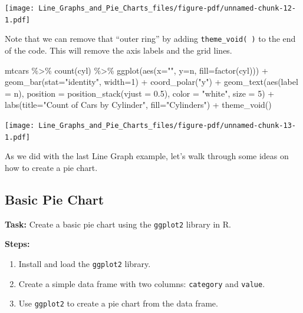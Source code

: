 \documentclass[
  letterpaper,
  DIV=11,
  numbers=noendperiod]{scrreprt}
\newenvironment{Shaded}{\begin{snugshade}}{\end{snugshade}}
\newcommand{\AttributeTok}[1]{\textcolor[rgb]{0.40,0.45,0.13}{#1}}
\newcommand{\DecValTok}[1]{\textcolor[rgb]{0.68,0.00,0.00}{#1}}
\newcommand{\FloatTok}[1]{\textcolor[rgb]{0.68,0.00,0.00}{#1}}
\newcommand{\FunctionTok}[1]{\textcolor[rgb]{0.28,0.35,0.67}{#1}}
\newcommand{\NormalTok}[1]{\textcolor[rgb]{0.00,0.23,0.31}{#1}}
\newcommand{\SpecialCharTok}[1]{\textcolor[rgb]{0.37,0.37,0.37}{#1}}
\newcommand{\StringTok}[1]{\textcolor[rgb]{0.13,0.47,0.30}{#1}}
\providecommand{\tightlist}{%
  \setlength{\itemsep}{0pt}\setlength{\parskip}{0pt}}\usepackage{longtable,booktabs,array}
\begin{document}
\texttt{[image: Line\_Graphs\_and\_Pie\_Charts\_files/figure-pdf/unnamed-chunk-12-1.pdf]}

Note that we can remove that ``outer ring'' by adding
\texttt{theme\_void(\ )} to the end of the code. This will remove the
axis labels and the grid lines.

\begin{Shaded}
\begin{Highlighting}[]
\NormalTok{mtcars }\SpecialCharTok{\%\textgreater{}\%}
  \FunctionTok{count}\NormalTok{(cyl) }\SpecialCharTok{\%\textgreater{}\%}
  \FunctionTok{ggplot}\NormalTok{(}\FunctionTok{aes}\NormalTok{(}\AttributeTok{x=}\StringTok{""}\NormalTok{, }\AttributeTok{y=}\NormalTok{n, }\AttributeTok{fill=}\FunctionTok{factor}\NormalTok{(cyl))) }\SpecialCharTok{+}
  \FunctionTok{geom\_bar}\NormalTok{(}\AttributeTok{stat=}\StringTok{"identity"}\NormalTok{, }\AttributeTok{width=}\DecValTok{1}\NormalTok{) }\SpecialCharTok{+}
  \FunctionTok{coord\_polar}\NormalTok{(}\StringTok{"y"}\NormalTok{) }\SpecialCharTok{+}
  \FunctionTok{geom\_text}\NormalTok{(}\FunctionTok{aes}\NormalTok{(}\AttributeTok{label =}\NormalTok{ n),}
        \AttributeTok{position =} \FunctionTok{position\_stack}\NormalTok{(}\AttributeTok{vjust =} \FloatTok{0.5}\NormalTok{),}
        \AttributeTok{color =} \StringTok{"white"}\NormalTok{, }\AttributeTok{size =} \DecValTok{5}\NormalTok{) }\SpecialCharTok{+}
  \FunctionTok{labs}\NormalTok{(}\AttributeTok{title=}\StringTok{"Count of Cars by Cylinder"}\NormalTok{,}
       \AttributeTok{fill=}\StringTok{"Cylinders"}\NormalTok{) }\SpecialCharTok{+}
  \FunctionTok{theme\_void}\NormalTok{()}
\end{Highlighting}
\end{Shaded}

\texttt{[image: Line\_Graphs\_and\_Pie\_Charts\_files/figure-pdf/unnamed-chunk-13-1.pdf]}

As we did with the last Line Graph example, let's walk through some
ideas on how to create a pie chart.

\subsection*{Basic Pie Chart}\label{basic-pie-chart}

\textbf{Task:} Create a basic pie chart using the \texttt{ggplot2}
library in R.

\textbf{Steps:}

\begin{enumerate}
\def\labelenumi{\arabic{enumi}.}
\tightlist
\item
  Install and load the \texttt{ggplot2} library.
\item
  Create a simple data frame with two columns: \texttt{category} and
  \texttt{value}.
\item
  Use \texttt{ggplot2} to create a pie chart from the data frame.
\end{enumerate}
\end{document}
